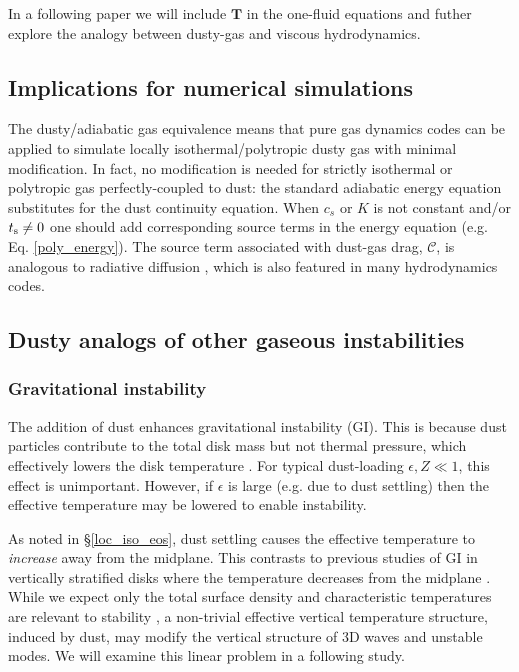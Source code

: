 In a following paper we will include $\bm{T}$ in the one-fluid
equations and futher explore the analogy between dusty-gas and viscous
hydrodynamics. 





\subsection{Implications for numerical simulations}
The dusty/adiabatic gas equivalence means that pure
gas dynamics codes can be applied to simulate locally
isothermal/polytropic dusty gas with minimal modification. In fact, no
modification is needed  
for strictly isothermal or polytropic gas perfectly-coupled to dust:  
the standard adiabatic energy equation substitutes for the dust continuity
equation. When $c_s$ or $K$ is not constant and/or $t_\mathrm{s}\neq0$ one
should add corresponding source terms in the energy equation
(e.g. Eq. \ref{poly_energy}). 
The source term associated with dust-gas drag, $\mathcal{C}$, is 
analogous to radiative diffusion \citep{price15}, which is also
featured in many hydrodynamics codes.      

\subsection{Dusty analogs of other gaseous instabilities}  


\subsubsection{Gravitational instability} %
The addition of dust enhances gravitational
instability (GI). This is because dust particles contribute to the
total disk mass but not thermal pressure, which effectively lowers the
disk temperature \citep[][]{thompson88,shi13}. For typical dust-loading 
$\epsilon, Z\ll1$, this effect is unimportant. However, if $\epsilon$ is
large (e.g. due to dust settling) then the effective temperature may 
be lowered to enable instability. 

As noted in \S\ref{loc_iso_eos}, dust settling causes the effective
temperature to \emph{increase} away from the midplane. This contrasts
to previous studies of GI in vertically stratified disks
 where the temperature decreases
from the midplane \citep[e.g.][]{mamat10, kim12,lin14c}. 
While we expect only the total surface density and
characteristic temperatures are relevant to stability  
\citep{toomre64}, a non-trivial effective vertical temperature
structure, induced by dust, may modify the vertical structure of 3D
waves and unstable modes. We will examine this linear problem in a following 
study.  



